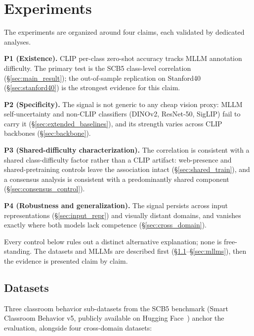 \documentclass[11pt,a4paper]{article}
\begin{document}
\section{Experiments}
\label{sec:experiments}

The experiments are organized around four claims, each validated by dedicated analyses.

\textbf{P1 (Existence).} CLIP per-class zero-shot accuracy tracks MLLM annotation difficulty. The primary test is the SCB5 class-level correlation (\S\ref{sec:main_result}); the out-of-sample replication on Stanford40 (\S\ref{sec:stanford40}) is the strongest evidence for this claim.

\textbf{P2 (Specificity).} The signal is not generic to any cheap vision proxy: MLLM self-uncertainty and non-CLIP classifiers (DINOv2, ResNet-50, SigLIP) fail to carry it (\S\ref{sec:extended_baselines}), and its strength varies across CLIP backbones (\S\ref{sec:backbone}).

\textbf{P3 (Shared-difficulty characterization).} The correlation is consistent with a shared class-difficulty factor rather than a CLIP artifact: web-presence and shared-pretraining controls leave the association intact (\S\ref{sec:shared_train}), and a consensus analysis is consistent with a predominantly shared component (\S\ref{sec:consensus_control}).

\textbf{P4 (Robustness and generalization).} The signal persists across input representations (\S\ref{sec:input_repr}) and visually distant domains, and vanishes exactly where both models lack competence (\S\ref{sec:cross_domain}).

Every control below rules out a distinct alternative explanation; none is free-standing. The datasets and MLLMs are described first (\S\ref{sec:datasets}--\S\ref{sec:mllms}), then the evidence is presented claim by claim.

\subsection{Datasets}
\label{sec:datasets}

Three classroom behavior sub-datasets from the SCB5 benchmark (Smart Classroom Behavior v5, publicly available on Hugging Face~\cite{scb_dataset}) anchor the evaluation, alongside four cross-domain datasets:
\end{document}
